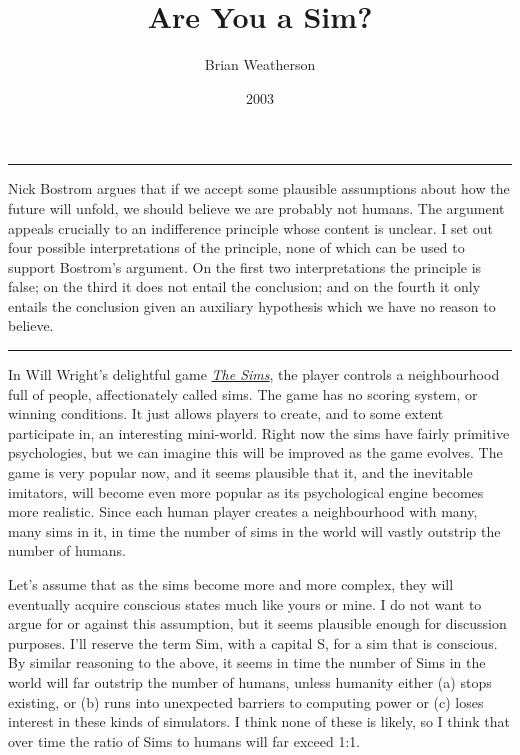 \documentclass[
  10pt,
  letterpaper,
  DIV=11,
  numbers=noendperiod,
  twoside]{scrartcl}
\title{Are You a Sim?}
\author{Brian Weatherson}
\date{2003}
\renewenvironment{abstract}
 {\vspace{-1.25cm}
 \quotation\small\noindent\rule{\linewidth}{.5pt}\par\smallskip
 \noindent }
 {\par\noindent\rule{\linewidth}{.5pt}\endquotation}
\begin{document}
\maketitle
\begin{abstract}
Nick Bostrom argues that if we accept some plausible assumptions about
how the future will unfold, we should believe we are probably not
humans. The argument appeals crucially to an indifference principle
whose content is unclear. I set out four possible interpretations of the
principle, none of which can be used to support Bostrom's argument. On
the first two interpretations the principle is false; on the third it
does not entail the conclusion; and on the fourth it only entails the
conclusion given an auxiliary hypothesis which we have no reason to
believe.
\end{abstract}


In Will Wright's delightful game \href{http://thesims.ea.com/}{\emph{The
Sims}}, the player controls a neighbourhood full of people,
affectionately called sims. The game has no scoring system, or winning
conditions. It just allows players to create, and to some extent
participate in, an interesting mini-world. Right now the sims have
fairly primitive psychologies, but we can imagine this will be improved
as the game evolves. The game is very popular now, and it seems
plausible that it, and the inevitable imitators, will become even more
popular as its psychological engine becomes more realistic. Since each
human player creates a neighbourhood with many, many sims in it, in time
the number of sims in the world will vastly outstrip the number of
humans.

Let's assume that as the sims become more and more complex, they will
eventually acquire conscious states much like yours or mine. I do not
want to argue for or against this assumption, but it seems plausible
enough for discussion purposes. I'll reserve the term Sim, with a
capital S, for a sim that is conscious. By similar reasoning to the
above, it seems in time the number of Sims in the world will far
outstrip the number of humans, unless humanity either (a) stops
existing, or (b) runs into unexpected barriers to computing power or (c)
loses interest in these kinds of simulators. I think none of these is
likely, so I think that over time the ratio of Sims to humans will far
exceed 1:1.
\end{document}
